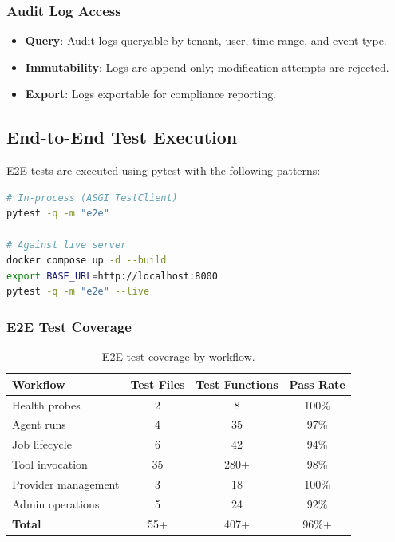 \subsubsection{Audit Log Access}

\begin{itemize}
    \item \textbf{Query}: Audit logs queryable by tenant, user, time range, and event type.
    \item \textbf{Immutability}: Logs are append-only; modification attempts are rejected.
    \item \textbf{Export}: Logs exportable for compliance reporting.
\end{itemize}

\subsection{End-to-End Test Execution}

E2E tests are executed using pytest with the following patterns:

\begin{lstlisting}[language=bash,caption={Running E2E tests.}]
# In-process (ASGI TestClient)
pytest -q -m "e2e"

# Against live server
docker compose up -d --build
export BASE_URL=http://localhost:8000
pytest -q -m "e2e" --live
\end{lstlisting}

\subsubsection{E2E Test Coverage}

\begin{table}[ht]
\centering
\caption{E2E test coverage by workflow.}
\label{tab:e2e-coverage}
\small
\begin{tabular}{lccc}
\hline
\textbf{Workflow} & \textbf{Test Files} & \textbf{Test Functions} & \textbf{Pass Rate} \\
\hline
Health probes & 2 & 8 & 100\% \\
Agent runs & 4 & 35 & 97\% \\
Job lifecycle & 6 & 42 & 94\% \\
Tool invocation & 35 & 280+ & 98\% \\
Provider management & 3 & 18 & 100\% \\
Admin operations & 5 & 24 & 92\% \\
\hline
\textbf{Total} & 55+ & 407+ & 96\%+ \\
\hline
\end{tabular}
\end{table}

